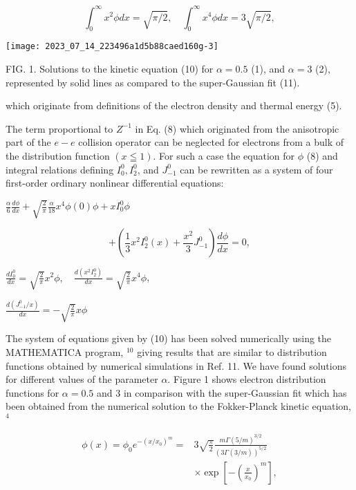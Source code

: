 \documentclass[10pt]{article}
\begin{document}
$$
\int_{0}^{\infty} x^{2} \phi d x=\sqrt{\pi / 2}, \quad \int_{0}^{\infty} x^{4} \phi d x=3 \sqrt{\pi / 2},
$$

\begin{center}
\texttt{[image: 2023\_07\_14\_223496a1d5b88caed160g-3]}
\end{center}

FIG. 1. Solutions to the kinetic equation (10) for $\alpha=0.5$ (1), and $\alpha=3$ (2), represented by solid lines as compared to the super-Gaussian fit (11).

which originate from definitions of the electron density and thermal energy (5).

The term proportional to $Z^{-1}$ in Eq. (8) which originated from the anisotropic part of the $e-e$ collision operator can be neglected for electrons from a bulk of the distribution function $(x \leqq 1)$. For such a case the equation for $\phi$ (8) and integral relations defining $I_{0}^{0}, I_{2}^{0}$, and $J_{-1}^{0}$ can be rewritten as a system of four first-order ordinary nonlinear differential equations:

$\frac{\alpha}{6} \frac{d \phi}{d x}+\sqrt{\frac{2}{\pi}} \frac{\alpha}{18} x^{4} \phi(0) \phi+x I_{0}^{0} \phi$

$$
+\left(\frac{1}{3} x^{2} I_{2}^{0}(x)+\frac{x^{2}}{3} J_{-1}^{0}\right) \frac{d \phi}{d x}=0,
$$

$\frac{d I_{0}^{0}}{d x}=\sqrt{\frac{2}{\pi}} x^{2} \phi, \quad \frac{d\left(x^{2} I_{2}^{0}\right)}{d x}=\sqrt{\frac{2}{\pi}} x^{4} \phi$,

$\frac{d\left(J_{-1}^{0} / x\right)}{d x}=-\sqrt{\frac{2}{\pi}} x \phi$

The system of equations given by (10) has been solved numerically using the MATHEMATICA program, ${ }^{10}$ giving results that are similar to distribution functions obtained by numerical simulations in Ref. 11. We have found solutions for different values of the parameter $\alpha$. Figure 1 shows electron distribution functions for $\alpha=0.5$ and 3 in comparison with the super-Gaussian fit which has been obtained from the numerical solution to the Fokker-Planck kinetic equation, ${ }^{4}$

$$
\begin{aligned}
\phi(x)=\phi_{0} e^{-\left(x / x_{0}\right)^{m}}= & 3 \sqrt{\frac{\pi}{2}} \frac{m \Gamma(5 / m)^{3 / 2}}{(3 \Gamma(3 / m))^{5 / 2}} \\
& \times \exp \left[-\left(\frac{x}{x_{0}}\right)^{m}\right],
\end{aligned}
$$
\end{document}

